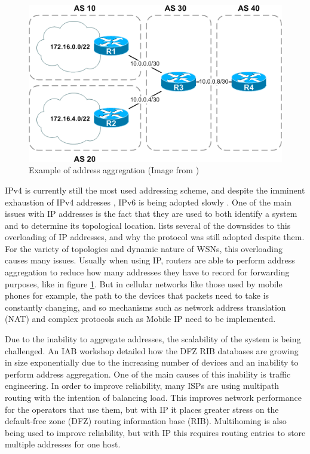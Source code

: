 \documentclass[12pt]{article}
\begin{document}
\begin{figure}[!ht]
	\centering
	\includegraphics[width=0.8 \linewidth]{images/agg}
	\caption{Example of address aggregation (Image from \cite{agg})}
	\label{fig:agg}
\end{figure}

IPv4 is currently still the most used addressing scheme, and despite the imminent exhaustion of IPv4 addresses \cite{ripe_labs}, IPv6 is being adopted slowly \cite{google_ipv6}. One of the main issues with IP addresses is the fact that they are used to both identify a system and to determine its topological location. \cite{briancarpenter2014} lists several of the downsides to this overloading of IP addresses, and why the protocol was still adopted despite them. 
For the variety of topologies and dynamic nature of WSNs, this overloading causes many issues. Usually when using IP, routers are able to perform address aggregation to reduce how many addresses they have to record for forwarding purposes, like in figure \ref{fig:agg}. But in cellular networks like those used by mobile phones for example, the path to the devices that packets need to take is constantly changing, and so mechanisms such as network address translation (NAT) and complex protocols such as Mobile IP need to be implemented. 


Due to the inability to aggregate addresses, the scalability of the system is being challenged. An IAB workshop \cite{rfc4984} detailed how the DFZ RIB databases are growing in size exponentially due to the increasing number of devices and an inability to perform address aggregation. One of the main causes of this inability is traffic engineering. In order to improve reliability, many ISPs are using multipath routing with the intention of balancing load. This improves network performance for the operators that use them, but with IP it places greater stress on the default-free zone (DFZ) routing information base (RIB). Multihoming is also being used to improve reliability, but with IP this requires routing entries to store multiple addresses for one host.  
\end{document}
